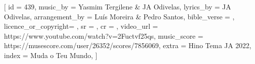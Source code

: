 [
    id                  = {439},
    music_by            = {Yasmim Tergilene & JA Odivelas}, %
    lyrics_by           = {JA Odivelas}, %
    arrangement_by      = {Luís Moreira & Pedro Santos}, %
    bible_verse         = {},
    licence_or_copyright= {},
    sr                  = {},
    cr                  = {},
    video_url           = {https://www.youtube.com/watch?v=2Fuctvf25qs}, 
    music_score         = {https://musescore.com/user/26352/scores/7856069},
    extra               = {Hino Tema JA 2022},
    index               = {Muda o Teu Mundo},
]

\beginverse
